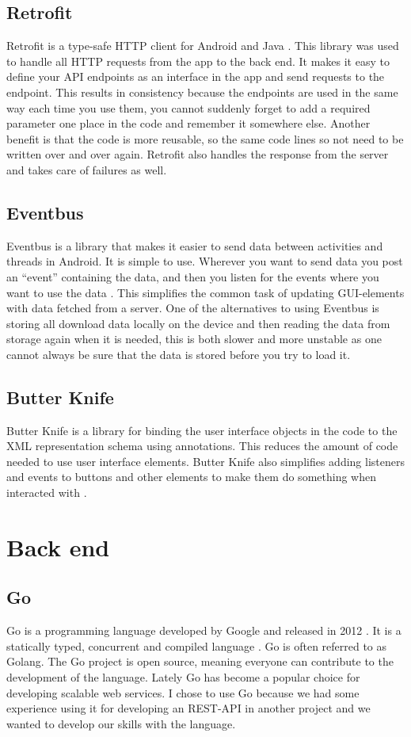 \documentclass[../Main/thesis.tex]{subfiles}
\begin{document}
\subsection{Retrofit}
Retrofit is a type-safe HTTP client for Android and Java \citep{SquareInc.2017}.
This library was used to handle all HTTP requests from the app to the back end. 
It makes it easy to define your API endpoints as an interface in the app and send requests to the endpoint.
This results in consistency because the endpoints are used in the same way each time you use them, you cannot suddenly forget to add a required parameter one place in the code and remember it somewhere else.
Another benefit is that the code is more reusable, so the same code lines so not need to be written over and over again.
Retrofit also handles the response from the server and takes care of failures as well.

\subsection{Eventbus}
Eventbus is a library that makes it easier to send data between activities and threads in Android. 
It is simple to use.
Wherever you want to send data you post an ``event'' containing the data, and then you listen for the events where you want to use the data \citep{Greenrobot2016}.
This simplifies the common task of updating GUI-elements with data fetched from a server.
One of the alternatives to using Eventbus is storing all download data locally on the device and then reading the data from storage again when it is needed, this is both slower and more unstable as one cannot always be sure that the data is stored before you try to load it. 

\subsection{Butter Knife}
Butter Knife is a library for binding the user interface objects in the code to the XML representation schema using annotations.
This reduces the amount of code needed to use user interface elements. 
Butter Knife also simplifies adding listeners and events to buttons and other elements to make them do something when interacted with \citep{Wharton2018}.

\section{Back end}

\subsection{Go}
Go is a programming language developed by Google and released in 2012 \citep{Google2018a}.
It is a statically typed, concurrent and compiled language \citep{Pike2012}.
Go is often referred to as Golang. 
The Go project is open source, meaning everyone can contribute to the development of the language.
Lately Go has become a popular choice for developing scalable web services.
I chose to use Go because we had some experience using it for developing an REST-API in another project and we wanted to develop our skills with the language.
\end{document}
